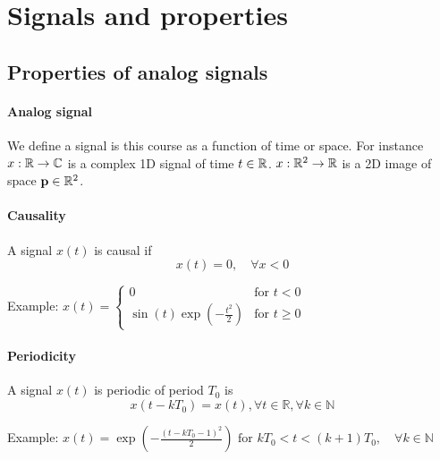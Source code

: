 
\section{Signals and properties}

\subsection{Properties of analog signals}

\paragraph{Analog signal} We define a signal is this course as a function of
time or space. For instance $x:\mathbb{R}\rightarrow\mathbb{C}$ is a complex 1D signal of time
$t\in\mathbb{R}$. $x:\mathbb{R}^2\rightarrow\mathbb{R}$ is a 2D image of space $\mathbf{p}\in\mathbb{R}^2$.

\paragraph{Causality}
A signal $x(t)$ is causal if 
$$ x(t)=0,\quad \forall x<0 $$

Example: $x(t)= \begin{cases}
0& \text{for } t<0\\
\sin(t)\exp\left(-\frac{t^2}{2}\right) & \text{for } t\geq 0
\end{cases}$

\paragraph{Periodicity} 
A signal $x(t)$ is periodic of period $T_0$ is
$$x(t-kT_0)=x(t),  \forall t\in\mathbb{R}, \forall k\in\mathbb{N}$$      


Example: $x(t)= %
  \exp\left(-\frac{(t-kT_0-1)^2}{2}\right)  \text{ for }kT_0<t<(k+1)T_0,\quad
  \forall k\in\mathbb{N}$
  
